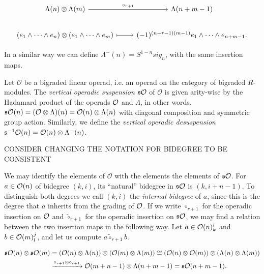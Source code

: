 \documentclass[twoside]{article}
\begin{document}
\[
\begin{tikzcd}
\Lambda(n)\otimes\Lambda(m) \arrow[r, "\circ_{r+1}"] & \Lambda(n+m-1)\\
(e_1\land\cdots\land e_n)\otimes(e_1\land\cdots\land e_m)\arrow[r, mapsto] & (-1)^{(n-r-1)(m-1)}e_1\land\cdots\land e_{n+m-1}.
\end{tikzcd}
\]



In a similar way we can define $\Lambda^-(n)=S^{1-n}sig_n$, with the same insertion maps.
\begin{definition}
Let $\mathcal{O}$ be a bigraded linear operad, i.e. an operad on the category of bigraded $R$-modules. The \emph{vertical operadic suspension} $\mathfrak{s}{\mathcal O}$ of $\mathcal{O}$ is given arity-wise by the Hadamard product of the operads ${\mathcal O}$ and $\Lambda$, in other words, $\mathfrak{s}{\mathcal O}(n)=(\mathcal{O}\otimes\Lambda)(n)=\mathcal{O}(n)\otimes\Lambda(n)$ with diagonal composition and symmetric group action. Similarly, we define the \emph{vertical operadic desuspension} $\mathfrak{s}^{-1}{\mathcal O}(n)=\mathcal{O}(n)\otimes\Lambda^-(n)$. %
\end{definition}

CONSIDER CHANGING THE NOTATION FOR BIDEGREE TO BE CONSISTENT

We may identify the elements of $\mathcal{O}$ with the elements the elements of $\mathfrak{s}{\mathcal O}$. For $a\in{\mathcal O}(n)$ of bidegree $(k,i)$, its ``natural'' bidegree in $\mathfrak{s}{\mathcal O}$ is $(k,i+n-1)$. To distinguish both degrees we call $(k,i)$ the \emph{internal bidegree} of $a$, since this is the degree that $a$ inherits from the grading of ${\mathcal O}$. If we write $\circ_{r+1}$ for the operadic insertion on ${\mathcal O}$ and $\tilde{\circ}_{r+1}$ for the operadic insertion on $\mathfrak{s}{\mathcal O}$, we may find a relation between the two insertion maps in the following way. Let $a\in{\mathcal O}(n)^i_k$ and $b\in{\mathcal O}(m)^j_l$, and let us compute $a\tilde{\circ}_{r+1} b$.

\begin{align*}
\mathfrak{s}{\mathcal O}(n)\otimes\mathfrak{s}{\mathcal O}(m)&=({\mathcal O}(n)\otimes\Lambda(n))\otimes ({\mathcal O}(m)\otimes\Lambda(m))\cong ({\mathcal O}(n)\otimes {\mathcal O}(m))\otimes (\Lambda(n)\otimes \Lambda(m))\\
&\xrightarrow{\circ_{r+1}\otimes\circ_{r+1}} {\mathcal O}(m+n-1)\otimes \Lambda(n+m-1)=\mathfrak{s}{\mathcal O}(n+m-1).
\end{align*}
\end{document}
